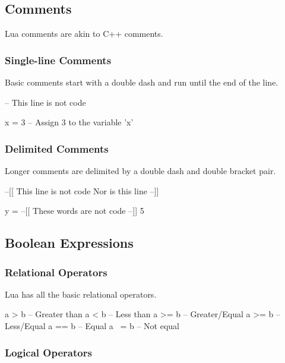 \subsection{Comments}

Lua comments are akin to C++ comments.

\subsubsection{Single-line Comments}

Basic comments start with a double dash and run until the end of the line.

\begin{LuaCode}
-- This line is not code
\end{LuaCode}

\begin{LuaCode}
x = 3 -- Assign 3 to the variable 'x'
\end{LuaCode}

\subsubsection{Delimited Comments}

Longer comments are delimited by a double dash and double bracket pair.

\begin{LuaCode}
--[[
This line is not code
Nor is this line
--]]
\end{LuaCode}

\begin{LuaCode}
y = --[[ These words are not code --]] 5
\end{LuaCode}

\subsection{Boolean Expressions}

\subsubsection{Relational Operators}

Lua has all the basic relational operators.

\begin{LuaCode}
a > b  -- Greater than
a < b  -- Less than
a >= b -- Greater/Equal
a >= b -- Less/Equal
a == b -- Equal
a ~= b -- Not equal
\end{LuaCode}

\subsubsection{Logical Operators}

